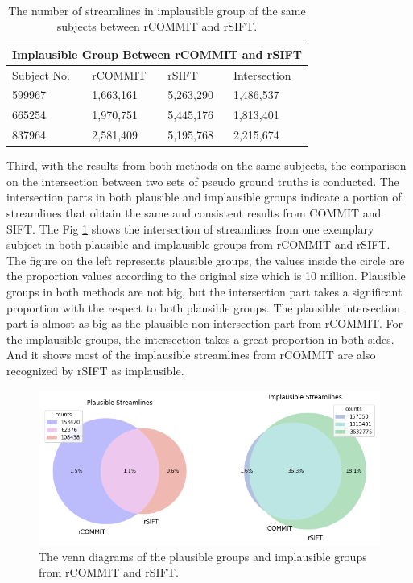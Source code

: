 \begin{table}[!ht]
    \centering
    \caption{The number of streamlines in implausible group of the same subjects between rCOMMIT and rSIFT.}
    ~\\
    \label{table:implaus}
    \begin{tabular}{p{3cm}|p{3cm}|p{3cm}|p{3cm}}
    \toprule
    \multicolumn{4}{c}{\textbf{Implausible Group Between rCOMMIT and rSIFT}} \\
    \toprule
    Subject No. & rCOMMIT & rSIFT & Intersection \\
    \hline
    599967 & 1,663,161 &5,263,290 & 1,486,537 \\
    \hline
    665254 & 1,970,751 &5,445,176 & 1,813,401 \\
    \hline
    837964 & 2,581,409 &5,195,768 & 2,215,674 \\
    \bottomrule
    \end{tabular}
\end{table}

Third, with the results from both methods on the same subjects, the comparison on the intersection between two sets of pseudo ground truths
is conducted. The intersection parts in both plausible and implausible groups indicate a portion of streamlines that obtain the 
same and consistent results from COMMIT and SIFT. The Fig \ref*{fig:com_s_c} shows the intersection of streamlines from one exemplary subject in both plausible 
and implausible groups from rCOMMIT and rSIFT. 
The figure on the left represents plausible groups, the values inside the circle are the proportion values
according to the original size which is 10 million. Plausible groups in both methods are not big, but the intersection part
takes a significant proportion with the respect to both plausible groups. 
The plausible intersection part is almost as big as the plausible non-intersection part from rCOMMIT.
For the implausible groups, the intersection takes a great proportion in both sides. 
And it shows most of the implausible streamlines from rCOMMIT are also recognized by rSIFT as implausible.


\begin{figure}[ht]
    \centering
    \includegraphics[width= 12cm]{figures/comp_s_c.png}
        \caption{The venn diagrams of the plausible groups and implausible groups from rCOMMIT and rSIFT.}
    \label{fig:com_s_c}
\end{figure}

